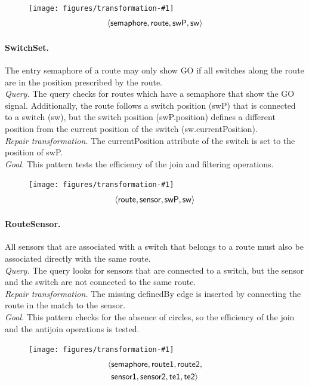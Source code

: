 \documentclass[submission,copyright,creativecommons]{eptcs}
\newcommand{\tuple}[1]{\langle #1 \rangle}
\newcommand{\ttctransformation}[2]{
	\begin{figure}
		\centering
		\vspace{-1em}
		\texttt{[image: figures/transformation-\#1]}
		\vspace{-1em}
		\footnotesize
		\begin{align*}
		\sf #2
		\end{align*}
		\vspace{-3em}
	\end{figure}
}
\begin{document}
\ttctransformation{switchset}{\tuple{semaphore, route, swP, sw}}
\paragraph{SwitchSet.} The entry semaphore of a route may only show GO if all switches along the route are in the position prescribed by the route. \\
\textit{Query.} The query checks for routes which have a semaphore that show the GO signal. Additionally, the route follows a switch position (\textsf{swP}) that is connected to a switch (\textsf{sw}), but the switch position (\textsf{swP.position}) defines a different position from the current position of the switch (\textsf{sw.currentPosition}). \\
\textit{Repair transformation.} The \textsf{currentPosition} attribute of the \textsf{switch} is set to the \textsf{position} of \textsf{swP}. \\
\textit{Goal.} This pattern tests the efficiency of the join and filtering operations.

\ttctransformation{routesensor}{\tuple{route, sensor, swP, sw}}
\paragraph{RouteSensor.} All sensors that are associated with a switch that belongs to a route must also be associated directly with the same route. \\
\textit{Query.} The query looks for sensors that are connected to a switch, but the sensor and the switch are not connected to the same route. \\
\textit{Repair transformation.} The missing \textsf{definedBy} edge is inserted by connecting the \textsf{route} in the match to the \textsf{sensor}. \\
\textit{Goal.} This pattern checks for the absence of circles, so the efficiency of the join and the antijoin operations is tested.

\ttctransformation{semaphoreneighbor}{\langle & \sf semaphore, route1, route2, \\ & \sf sensor1, sensor2, te1, te2 \rangle}
\end{document}
